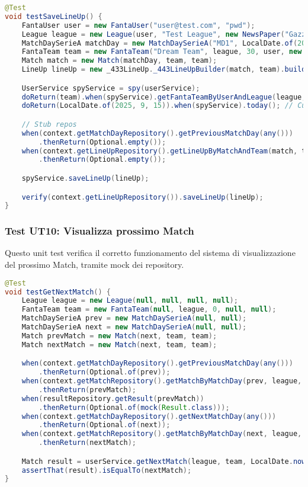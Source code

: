 \begin{lstlisting}[language=Java]
@Test
void testSaveLineUp() {
	FantaUser user = new FantaUser("user@test.com", "pwd");
	League league = new League(user, "Test League", new NewsPaper("Gazzetta"), "L003");
	MatchDaySerieA matchDay = new MatchDaySerieA("MD1", LocalDate.of(2025, 9, 15)); // Monday
	FantaTeam team = new FantaTeam("Dream Team", league, 30, user, new HashSet<>());
	Match match = new Match(matchDay, team, team);
	LineUp lineUp = new _433LineUp._443LineUpBuilder(match, team).build();

	UserService spyService = spy(userService);
	doReturn(team).when(spyService).getFantaTeamByUserAndLeague(league, user);
	doReturn(LocalDate.of(2025, 9, 15)).when(spyService).today(); // Current Monday

	// Stub repos
	when(context.getMatchDayRepository().getPreviousMatchDay(any()))
        .thenReturn(Optional.empty());
	when(context.getLineUpRepository().getLineUpByMatchAndTeam(match, team))
        .thenReturn(Optional.empty());

	spyService.saveLineUp(lineUp);

	verify(context.getLineUpRepository()).saveLineUp(lineUp);
}
\end{lstlisting}


\subsubsection{Test UT10: Visualizza prossimo Match} \label{UT10}

Questo unit test verifica il corretto funzionamento del sistema di visualizzazione del prossimo Match,
tramite mock dei repository.

\begin{lstlisting}[language=Java]
@Test
void testGetNextMatch() {
    League league = new League(null, null, null, null);
	FantaTeam team = new FantaTeam(null, league, 0, null, null);
	MatchDaySerieA prev = new MatchDaySerieA(null, null);
	MatchDaySerieA next = new MatchDaySerieA(null, null);
	Match prevMatch = new Match(next, team, team);
	Match nextMatch = new Match(next, team, team);

	when(context.getMatchDayRepository().getPreviousMatchDay(any()))
        .thenReturn(Optional.of(prev));
	when(context.getMatchRepository().getMatchByMatchDay(prev, league, team))
        .thenReturn(prevMatch);
	when(resultRepository.getResult(prevMatch))
        .thenReturn(Optional.of(mock(Result.class)));
	when(context.getMatchDayRepository().getNextMatchDay(any()))
        .thenReturn(Optional.of(next));
	when(context.getMatchRepository().getMatchByMatchDay(next, league, team))
        .thenReturn(nextMatch);

	Match result = userService.getNextMatch(league, team, LocalDate.now());
	assertThat(result).isEqualTo(nextMatch);
}
\end{lstlisting}


